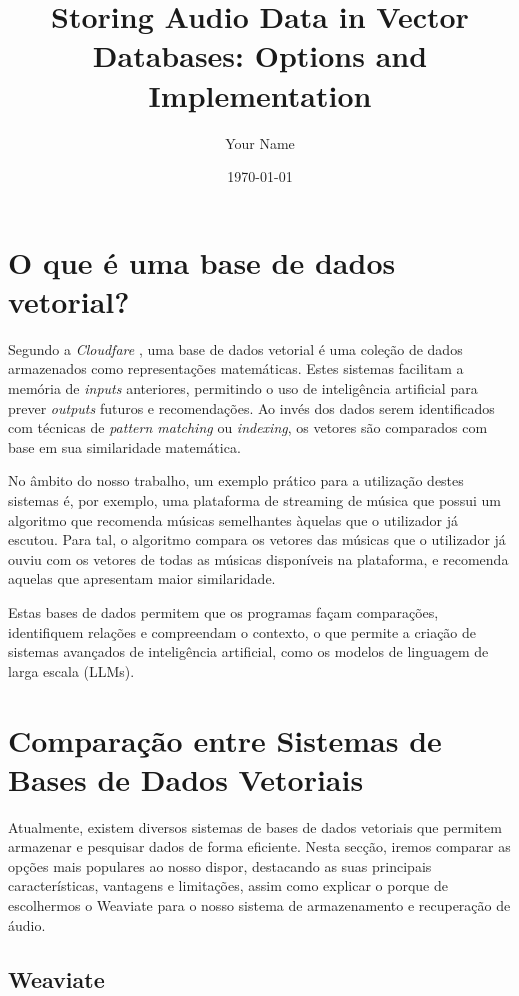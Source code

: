 \documentclass{article}
\title{Storing Audio Data in Vector Databases: Options and Implementation}
\author{Your Name}
\date{\today}
\begin{document}
\maketitle



\section{O que é uma base de dados vetorial?}


Segundo a \textit{Cloudfare} \cite{cloudflare_vector_db}, uma base de dados vetorial é uma coleção de dados armazenados como representações matemáticas. Estes sistemas facilitam a memória de \textit{inputs} anteriores, permitindo o uso de inteligência artificial para prever \textit{outputs} futuros e recomendações. Ao invés dos dados serem identificados com técnicas de \textit{pattern matching} ou \textit{indexing}, os vetores são comparados com base em sua similaridade matemática.

No âmbito do nosso trabalho, um exemplo prático para a utilização destes sistemas é, por exemplo, uma plataforma de streaming de música que possui um algoritmo que recomenda músicas semelhantes àquelas que o utilizador já escutou. Para tal, o algoritmo compara os vetores das músicas que o utilizador já ouviu com os vetores de todas as músicas disponíveis na plataforma, e recomenda aquelas que apresentam maior similaridade.

Estas bases de dados permitem que os programas façam comparações, identifiquem relações e compreendam o contexto, o que permite a criação de sistemas avançados de inteligência artificial, como os modelos de linguagem de larga escala (LLMs).

\section{Comparação entre Sistemas de Bases de Dados Vetoriais}

Atualmente, existem diversos sistemas de bases de dados vetoriais que permitem armazenar e pesquisar dados de forma eficiente. Nesta secção, iremos comparar as opções mais populares ao nosso dispor, destacando as suas principais características, vantagens e limitações, assim como explicar o porque de escolhermos o Weaviate para o nosso sistema de armazenamento e recuperação de áudio.

\subsection{Weaviate}
\end{document}
